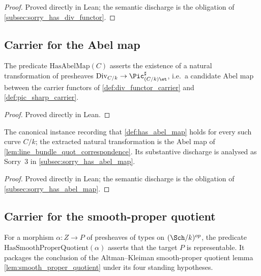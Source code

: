 \begin{proof}

\leanok
  Proved directly in Lean; the semantic discharge is the obligation of
  \cref{subsec:sorry_has_div_functor}.
\end{proof}

\subsection{Carrier for the Abel map}
\label{subsec:fga_pic_abel_map_carrier}

\begin{definition}
  \label{def:has_abel_map}
  The predicate \(\mathrm{HasAbelMap}(C)\) asserts the existence of a natural
  transformation of presheaves \(\mathrm{Div}_{C/k} \to \Pic^\sharp_{(C/k)\et}\),
  i.e.\ a candidate Abel map between the carrier functors of
  \cref{def:div_functor_carrier} and \cref{def:pic_sharp_carrier}.
\end{definition}

\begin{proof}
  Proved directly in Lean.
\end{proof}

\begin{definition}
  \label{def:inst_has_abel_map}
  The canonical instance recording that \cref{def:has_abel_map} holds for every
  such curve \(C/k\); the extracted natural transformation is the Abel map of
  \cref{lem:line_bundle_quot_correspondence}. Its substantive discharge is
  analysed as Sorry~3 in \cref{subsec:sorry_has_abel_map}.
\end{definition}

\begin{proof}

\leanok
  Proved directly in Lean; the semantic discharge is the obligation of
  \cref{subsec:sorry_has_abel_map}.
\end{proof}

\subsection{Carrier for the smooth-proper quotient}
\label{subsec:fga_pic_quotient_carrier}

\begin{definition}
  \label{def:has_smooth_proper_quotient}
  For a morphism \(\alpha : Z \to P\) of presheaves of types on
  \((\Sch/k)^{op}\), the predicate \(\mathrm{HasSmoothProperQuotient}(\alpha)\) asserts
  that the target \(P\) is representable. It packages the conclusion of the
  Altman--Kleiman smooth-proper quotient lemma \cref{lem:smooth_proper_quotient}
  under its four standing hypotheses.
\end{definition}

